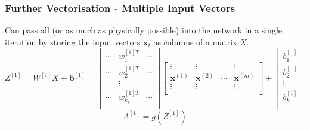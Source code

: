 \documentclass{beamer}
\newcommand{\mb}[1]{\mathbf{#1}}
\begin{document}
% 
% 
% 
% 
\begin{frame}
  \frametitle{Further Vectorisation - Multiple Input Vectors}
  Can pass all (or as much as physically possible) into the network in a single iteration by storing the input vectors $\mb{x}_i$ as columns of a matrix $X$.
  \begin{equation*}
    Z^{[1]} = W^{[1]} X + \mathbf{b}^{[1]} = 
    \begin{bmatrix}
      \cdots & w_{1}^{[1]T} & \cdots \\
      \cdots & w_{2}^{[1]T} & \cdots \\
      & \vdots       &  \\
      \cdots & w_{k_l}^{[1]T} & \cdots \\
    \end{bmatrix}
    \begin{bmatrix}
      \vdots & \vdots & & \vdots\\
      \mathbf{x}^{(1)} & \mathbf{x}^{(2)} &  \cdots & \mathbf{x}^{(m)}\\
      \vdots & \vdots & & \vdots\\
    \end{bmatrix}
    + 
    \begin{bmatrix}
      b_{1}^{[1]} \\
      b_{2}^{[1]} \\
      \vdots \\
      b_{k_l}^{[1]} \\
    \end{bmatrix}
  \end{equation*}
  \vspace*{1cm}
  \begin{equation*}
    A^{[1]} = g( Z^{[1]} )
  \end{equation*}
\end{frame}
% 
% 
% 
% 
\end{document}
